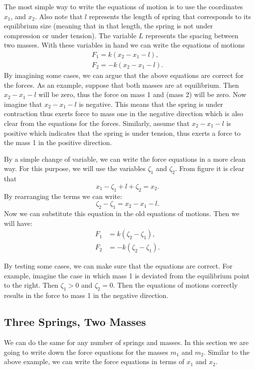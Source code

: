 \documentclass[11pt,a4paper]{article}
\begin{document}
The most simple way to write the equations of motion is to use the coordinates $x_1$, and $x_2$. Also note that $l$ represents the length of spring that corresponds to its equilibrium size (meaning that in that length, the spring is not under compression or under tension). The variable $L$ represents the spacing between two masses. With these variables in hand we can write the equations of motions
\begin{align*}
	F_1 = k (x_2-x_1-l), \\
	F_2 =- k (x_2 - x_1 - l).
\end{align*}
By imagining some cases, we can argue that the above equations are correct for the forces. As an example, suppose that both masses are at equilibrium. Then $x_2 - x_1 - l$ will be zero, thus the force on mass 1 and (mass 2) will be zero. Now imagine that $x_2 - x_1 - l$ is negative. This means that the spring is under contraction thus exerts force to mass one in the negative direction which is also clear from the equations for the forces. Similarly, assume that $x_2 - x_1 - l$ is positive which indicates that the spring is under tension, thus exerts a force to the mass 1 in the positive direction.

By a simple change of variable, we can write the force equations in a more clean way. For this purpose, we will use the variables $\zeta_1$ and $\zeta_{2}$. From figure it is clear that
\[ x_1 - \zeta_{1} + l + \zeta_{2} = x_2. \]
By rearranging the terms we can write:
\[ \zeta_{2} - \zeta_{1} = x_2 - x_1 - l. \] 
Now we can substitute this equation in the old equations of motions. Then we will have:
\begin{align*}
	F_1 &= k(\zeta_{2} - \zeta_{1}), \\
	F_2 &= -k(\zeta_{2} - \zeta_{1}).
\end{align*}

By testing some cases, we can make sure that the equations are correct. For example, imagine the case in which mass 1 is deviated from the equilibrium point to the right. Then $\zeta_{1}>0$ and $\zeta_{2}=0$. Then the equations of motions correctly results in the force to mass 1 in the negative direction.

\subsection{Three Springs, Two Masses}
We can do the same for any number of springs and masses. In this section we are going to write down the force equations for the masses $m_1$ and $m_2$. Similar to the above example, we can write the force equations in terms of $x_1$ and $x_2$.
\end{document}
